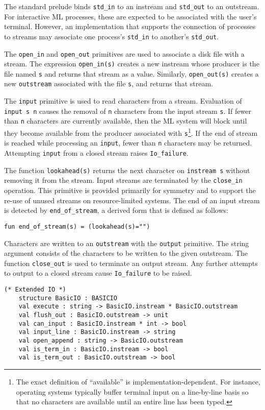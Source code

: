 The standard prelude binds \verb"std_in" to an instream and
\verb"std_out" to an outstream.  For interactive ML processes, these
are expected to be associated with the user's terminal.  However, an
implementation that supports the connection of processes to streams
may associate one process's \verb"std_in" to another's
\verb"std_out".

The \verb"open_in" and \verb"open_out" primitives are used to
associate a disk file with a stream.  The expression
\verb"open_in(s)" creates a new instream whose producer is the file
named \verb"s" and returns that stream as a value.
Similarly, \verb"open_out(s)" creates a new \verb"outstream"
associated with the file \verb"s", and returns that stream.

The \verb"input" primitive is used to read characters from a stream.
Evaluation of \verb"input s n" causes the removal of \verb"n"
characters from the input stream \verb"s".  If fewer than \verb"n"
characters are currently available, then the ML system will block
until they become available from the producer associated with
\verb"s"\footnote{The exact definition of ``available'' is
implementation-dependent.  For instance, operating systems typically
buffer terminal input on a line-by-line basis so that no characters
are available until an entire line has been typed.}.
If the end of stream is reached while processing an \verb"input",
fewer than \verb"n" characters may be returned.  
Attempting \verb"input" from a closed stream raises
\verb"Io_failure".

The function \verb"lookahead(s)" returns the next character on
\verb"instream s" without removing it from the stream.  Input streams
are terminated by the \verb"close_in" operation.  This primitive is
provided primarily for symmetry and to support the re-use of
unused streams on resource-limited systems.  The end of an input
stream is detected by \verb"end_of_stream", a derived form that is
defined as follows:
\begin{verbatim}
fun end_of_stream(s) = (lookahead(s)="")
\end{verbatim}

Characters are written to an \verb"outstream" with the \verb"output"
primitive.  The string argument consists of the characters to be
written to the given outstream.  The function \verb"close_out" is
used to terminate an output stream.  Any further attempts to output
to a closed stream cause \verb"Io_failure" to be raised.

\begin{verbatim}
(* Extended IO *)
    structure BasicIO : BASICIO
    val execute : string -> BasicIO.instream * BasicIO.outstream
    val flush_out : BasicIO.outstream -> unit
    val can_input : BasicIO.instream * int -> bool
    val input_line : BasicIO.instream -> string
    val open_append : string -> BasicIO.outstream
    val is_term_in : BasicIO.instream -> bool
    val is_term_out : BasicIO.outstream -> bool
\end{verbatim}

